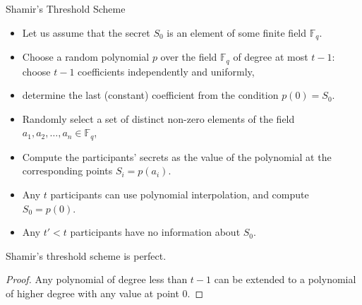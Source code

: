 \documentclass[aspectratio=169]{beamer}
\newcommand{\pitem}{\pause\item}
\newcommand{\seqn}[2]{{#1}_1,{#1}_2,\dotsc,{#1}_{#2}}
\begin{document}
\begin{frame}{Shamir's Threshold Scheme}
    \begin{itemize}
    \item Let us assume that the secret $S_0$ is an element of some finite field $\mathbb{F}_q$.

    \pitem Choose a random polynomial $p$ over the field $\mathbb{F}_q$ of degree at most $t-1$: choose $t-1$ coefficients independently and uniformly,

    \pitem determine the last (constant) coefficient from the condition $p(0) = S_0$.

    \pitem Randomly select a set of distinct non-zero elements of the field $\seqn{a}{n} \in \mathbb{F}_q$,

    \pitem Compute the participants' secrets as the value of the polynomial at the corresponding points $S_i = p(a_i)$.

    \pitem Any $t$ participants can use polynomial interpolation, and compute $S_0 = p(0)$.

    \pitem Any $t' < t$ participants have no information about $S_0$.
    \end{itemize}

    \pause
    \begin{theorem}
        Shamir's threshold scheme is perfect.
    \end{theorem}
    \pause
    \begin{proof}
        Any polynomial of degree less than $t-1$ can be extended to a polynomial of higher degree with any value at point $0$.
        \end{proof}	\end{frame}
\end{document}
